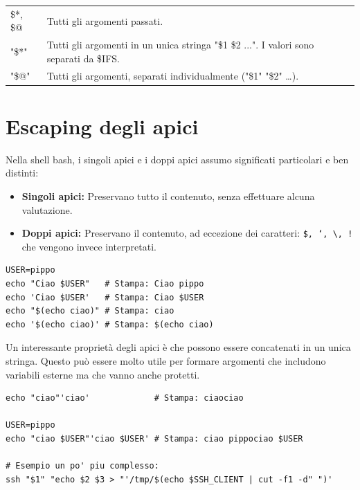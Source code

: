 \documentclass[a4paper]{report}
\newenvironment{info}{\begin{tcolorbox}[fonttitle=\sffamily\bfseries\large,title=Info,colframe=blue!75!white]}{\end{tcolorbox}}
\newenvironment{code}{\begin{tcolorbox}[size=small]}{\end{tcolorbox}}
\begin{document}
\begin{table}[h]
\begin{tabular}{ll}
		\$*, \$@ & Tutti gli argomenti passati.                                                                                                                                                                                                                                                                                                                                                                                              \\
		"\$*"  & Tutti gli argomenti in un unica stringa "\$1 \$2 ...". I valori sono separati da \$IFS.      \\
		"\$@"  & Tutti gli argomenti, separati individualmente ("\$1" "\$2" …).                                                                                                                                                                                                                                                                                                                                                                         
	\end{tabular}
\end{table}

\section{Escaping degli apici}

Nella shell bash, i singoli apici e i doppi apici assumo significati particolari e ben distinti:

\begin{itemize}
\item \textbf{Singoli apici:} Preservano tutto il contenuto, senza effettuare alcuna valutazione.
\item \textbf{Doppi apici:} Preservano il contenuto, ad eccezione dei caratteri: \texttt{\$, `, \textbackslash, !} che vengono invece interpretati. 
\end{itemize}

\begin{code}
\begin{lstlisting}
USER=pippo
echo "Ciao $USER"   # Stampa: Ciao pippo
echo 'Ciao $USER'   # Stampa: Ciao $USER
echo "$(echo ciao)" # Stampa: ciao
echo '$(echo ciao)' # Stampa: $(echo ciao)
\end{lstlisting}
\end{code}

\begin{info}
Un interessante proprietà degli apici è che possono essere concatenati in un unica stringa. Questo può essere molto utile per formare argomenti che includono variabili esterne ma che vanno anche protetti.

\begin{lstlisting}
echo "ciao"'ciao'             # Stampa: ciaociao

USER=pippo
echo "ciao $USER"'ciao $USER' # Stampa: ciao pippociao $USER

# Esempio un po' piu complesso:
ssh "$1" "echo $2 $3 > "'/tmp/$(echo $SSH_CLIENT | cut -f1 -d" ")'
\end{lstlisting}

\end{info}
\end{document}
